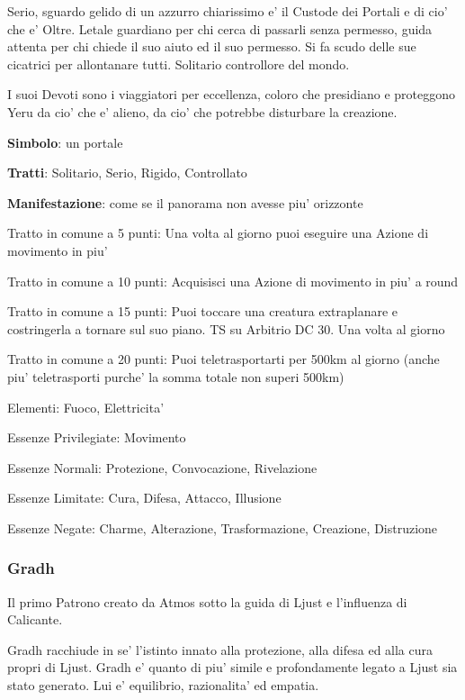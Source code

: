\documentclass[a4paper,11pt,twoside,openany]{book}
\begin{document}
{		Serio, sguardo gelido di un azzurro chiarissimo e' il Custode dei Portali e di cio' che e' Oltre. Letale guardiano per chi cerca di passarli senza permesso, guida attenta per chi chiede il suo aiuto ed il suo permesso. Si fa scudo delle sue cicatrici per allontanare tutti. 
		Solitario controllore del mondo.
		
		I suoi Devoti sono i viaggiatori per eccellenza, coloro che presidiano e proteggono Yeru da cio' che e' alieno, da cio' che potrebbe disturbare la creazione.
		
		\textbf{Simbolo}: un portale
		
		\textbf{Tratti}: Solitario, Serio, Rigido, Controllato
		
		\textbf{Manifestazione}: come se il panorama non avesse piu' orizzonte
		
		\bigskip
		
		Tratto in comune a 5 punti: Una volta al giorno puoi eseguire una Azione di movimento in piu'
		
		Tratto in comune a 10 punti: Acquisisci una Azione di movimento in piu' a round
		
		Tratto in comune a 15 punti: Puoi toccare una creatura extraplanare e costringerla a tornare sul suo piano. TS su Arbitrio DC 30. Una volta al giorno
		
		Tratto in comune a 20 punti: Puoi teletrasportarti per 500km al giorno (anche piu' teletrasporti purche' la somma totale non superi 500km)
		
		\bigskip
		
		Elementi: Fuoco, Elettricita'
		
		\bigskip
		
		Essenze Privilegiate: Movimento
		
		Essenze Normali: Protezione, Convocazione, Rivelazione
		
		Essenze Limitate: Cura, Difesa, Attacco, Illusione
		
		Essenze Negate: Charme, Alterazione, Trasformazione, Creazione, Distruzione
		
		\subsubsection{Gradh}
		
		\label{gradh}
		
		Il primo Patrono creato da Atmos sotto la guida di Ljust e l'influenza di Calicante.
		
		Gradh racchiude in se' l'istinto innato alla protezione, alla difesa ed alla cura propri di Ljust. Gradh e' quanto di piu' simile e profondamente legato a Ljust sia stato generato. Lui e' equilibrio, razionalita' ed empatia.
		
}
\end{document}
